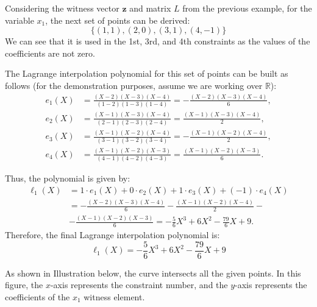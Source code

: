 \documentclass[../lecture-notes-148x210.tex]{subfiles}
\begin{document}
\begin{example}
    Considering the witness vector $\mathbf{z}$ and matrix $L$ from the previous example, for the variable
    $x_1$, the next set of points can be derived:
    \begin{equation*}
        \{(1,1), (2,0), (3,1), (4,-1)\}
    \end{equation*}
    We can see that it is used in the 1st, 3rd, and 4th constraints as the values of the coefficients
    are not zero.
    
    The Lagrange interpolation polynomial for this set of points can be built as
    follows (for the demonstration purposes, assume we are working over
    $\mathbb{R}$):
    \begin{align*}
        e_1(X) &= \frac{(X - 2)(X - 3)(X - 4)}{(1 - 2)(1 - 3)(1 - 4)} = -\frac{(X - 2)(X - 3)(X - 4)}{6}, \\
        e_2(X) &= \frac{(X - 1)(X - 3)(X - 4)}{(2 - 1)(2 - 3)(2 - 4)} = \frac{(X - 1)(X - 3)(X - 4)}{2}, \\
        e_3(X) &= \frac{(X - 1)(X - 2)(X - 4)}{(3 - 1)(3 - 2)(3 - 4)} = -\frac{(X - 1)(X - 2)(X - 4)}{2}, \\
        e_4(X) &= \frac{(X - 1)(X - 2)(X - 3)}{(4 - 1)(4 - 2)(4 - 3)} = \frac{(X - 1)(X - 2)(X - 3)}{6}.
    \end{align*}

    Thus, the polynomial is given by:
    \begin{equation*}
        \begin{aligned}
            \ell_1(X) &= 1 \cdot e_1(X) + 0 \cdot e_2(X) + 1 \cdot e_3(X) + (-1) \cdot e_4(X) \\
            &= -\frac{(X - 2)(X - 3)(X - 4)}{6} - \frac{(X - 1)(X - 2)(X - 4)}{2} - \\ 
            &- \frac{(X - 1)(X - 2)(X - 3)}{6} = -\frac{5}{6}X^3 + 6X^2 - \frac{79}{6}X + 9.
        \end{aligned}
    \end{equation*}
    Therefore, the final Lagrange interpolation polynomial is:
    \begin{equation*}
        \ell_1(X) = -\frac{5}{6}X^3 + 6X^2 - \frac{79}{6}X + 9
    \end{equation*}

    As shown in Illustration below, the curve intersects all the given points.
    In this figure, the $x$-axis represents the constraint number, and the
    $y$-axis represents the coefficients of the $x_1$ witness element.


\end{example}
\end{document}
